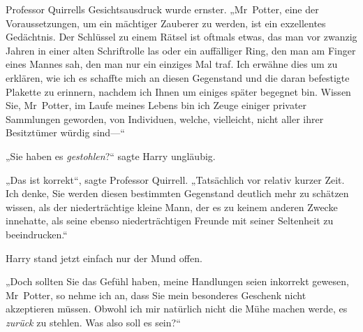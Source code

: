 Professor Quirrells Gesichtsausdruck wurde ernster. „Mr~Potter, eine der Voraussetzungen, um ein mächtiger Zauberer zu werden, ist ein exzellentes Gedächtnis. Der Schlüssel zu einem Rätsel ist oftmals etwas, das man vor zwanzig Jahren in einer alten Schriftrolle las oder ein auffälliger Ring, den man am Finger eines Mannes sah, den man nur ein einziges Mal traf. Ich erwähne dies um zu erklären, wie ich es schaffte mich an diesen Gegenstand und die daran befestigte Plakette zu erinnern, nachdem ich Ihnen um einiges später begegnet bin. Wissen Sie, Mr~Potter, im Laufe meines Lebens bin ich Zeuge einiger privater Sammlungen geworden, von Individuen, welche, vielleicht, nicht aller ihrer Besitztümer würdig sind—“

„Sie haben es \emph{gestohlen}?“ sagte Harry ungläubig.

„Das ist korrekt“, sagte Professor Quirrell. „Tatsächlich vor relativ kurzer Zeit. Ich denke, Sie werden diesen bestimmten Gegenstand deutlich mehr zu schätzen wissen, als der niederträchtige kleine Mann, der es zu keinem anderen Zwecke innehatte, als seine ebenso niederträchtigen Freunde mit seiner Seltenheit zu beeindrucken.“

Harry stand jetzt einfach nur der Mund offen.

„Doch sollten Sie das Gefühl haben, meine Handlungen seien inkorrekt gewesen, Mr~Potter, so nehme ich an, dass Sie mein besonderes Geschenk nicht akzeptieren müssen. Obwohl ich mir natürlich nicht die Mühe machen werde, es \emph{zurück} zu stehlen. Was also soll es sein?“

